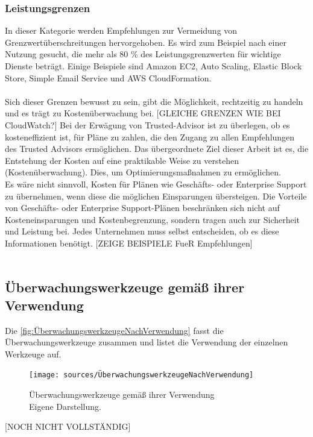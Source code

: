 \subsubsection*{Leistungsgrenzen}
In dieser Kategorie werden Empfehlungen zur Vermeidung von Grenzwertüberschreitungen hervorgehoben.
Es wird zum Beispiel nach einer Nutzung gesucht, die mehr als 80 \% des Leistungsgrenzwerten für wichtige Dienste beträgt. Einige Beispiele sind  Amazon EC2, Auto Scaling, Elastic Block Store, Simple Email Service und AWS CloudFormation.
\\\\
Sich dieser Grenzen bewusst zu sein, gibt die Möglichkeit, rechtzeitig zu handeln und es trägt zu Kostenüberwachung bei.
[GLEICHE GRENZEN WIE BEI CloudWatch?]
Bei der Erwägung von Trusted-Advisor ist zu überlegen, ob es kosteneffizient ist, für Pläne zu zahlen, die den Zugang zu allen Empfehlungen des Trusted Advisors ermöglichen. Das übergeordnete Ziel dieser Arbeit ist es, die Entstehung der Kosten auf eine praktikable Weise zu verstehen (Kostenüberwachung). Dies, um Optimierungsmaßnahmen zu ermöglichen. 
\\
Es wäre nicht sinnvoll, Kosten für Plänen wie Geschäfts- oder Enterprise Support zu übernehmen, wenn diese die möglichen Einsparungen übersteigen.  Die Vorteile von Geschäfts- oder Enterprise Support-Plänen beschränken sich nicht auf Kosteneinsparungen und Kostenbegrenzung, sondern tragen auch zur Sicherheit und Leistung bei. Jedes Unternehmen muss selbst entscheiden, ob es diese Informationen benötigt.
[ZEIGE BEISPIELE FueR Empfehlungen]\\
\\
\subsection{Überwachungswerkzeuge gemäß ihrer Verwendung}
Die \autoref{fig:ÜberwachungswerkzeugeNachVerwendung} fasst die Überwachungswerkzeuge zusammen und listet die Verwendung der einzelnen Werkzeuge auf.
\begin{figure}[h!]
  \centering
  \texttt{[image: sources/ÜberwachungswerkzeugeNachVerwendung]}
  \caption[Überwachungswerkzeuge gemäß ihrer Verwendung]{}
  \label{fig:ÜberwachungswerkzeugeNachVerwendung} 
  Überwachungswerkzeuge gemäß ihrer Verwendung\\
  Eigene Darstellung\cite{AMZ12, AMZ20, AMZ21}. 
\end{figure}
[NOCH NICHT VOLLSTÄNDIG]

